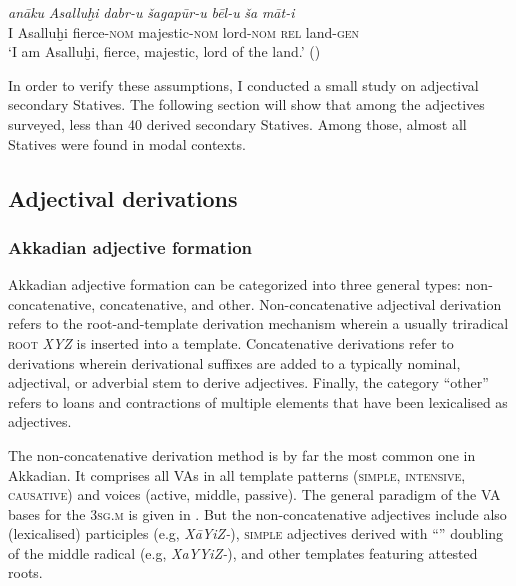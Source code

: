\documentclass[output=paper,colorlinks,citecolor=brown]{langscibook}
\begin{document}
\begin{exe} 
\ex \label{ex:predadj}
\gll  \textit{anāku} \textit{Asalluḫi} \textit{dabr-u} \textit{šagapūr-u} \textit{bēl-u} \textit{ša} \textit{māt-i}\\
     I Asalluḫi fierce-\textsc{nom} majestic-\textsc{nom} lord-\textsc{nom} \textsc{rel} land-\textsc{gen}\\
    \glt `I am Asalluḫi, fierce, majestic, lord of the land.' (\citealt[313, C 8]{Lambert1954})
\end{exe}


 In order to verify these assumptions, I conducted a small study on adjectival secondary Statives. The following section will show that among the adjectives surveyed, less than 40 derived secondary Statives. Among those, almost all Statives were found in modal contexts.

\subsection{Adjectival derivations}
\label{sec:adjder}

\subsubsection{Akkadian adjective formation}
\label{sec:akkadjform}

Akkadian adjective formation can be categorized into three general types: non-concatenative, concatenative, and other. Non-concatenative adjectival derivation refers to the root-and-template derivation mechanism wherein a usually triradical \textsc{root} \textit{XYZ} is inserted into a template. Concatenative derivations refer to derivations wherein derivational suffixes are added to a typically nominal, adjectival, or adverbial stem to derive adjectives. Finally, the category “other” refers to loans and contractions of multiple elements that have been lexicalised as adjectives.

The non-concatenative derivation method is by far the most common one in Akkadian. It comprises all VAs in all template patterns (\textsc{simple}, \textsc{intensive}, \textsc{causative}) and voices (active, middle, passive). The general paradigm of the VA bases for the \textsc{3sg.m} is given in . But the non-concatenative adjectives include also (lexicalised) participles (e.g, \textit{XāYiZ-}), \textsc{simple} adjectives derived with “” doubling of the middle radical (e.g, \textit{XaYYiZ-}), and other templates featuring attested roots.
\end{document}
